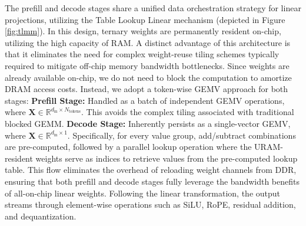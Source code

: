 \documentclass[9pt,sigconf]{acmart}
\begin{document}


The prefill and decode stages share a unified data orchestration strategy for linear projections, utilizing the Table Lookup Linear mechanism (depicted in Figure \ref{fig:tlmm}). In this design, ternary weights are permanently resident on-chip, utilizing the high capacity of RAM. A distinct advantage of this architecture is that it eliminates the need for complex weight-reuse tiling schemes typically required to mitigate off-chip memory bandwidth bottlenecks. Since weights are already available on-chip, we do not need to block the computation to amortize DRAM access costs. Instead, we adopt a token-wise GEMV approach for both stages:
\textbf{Prefill Stage:} Handled as a batch of independent GEMV operations, where $\mathbf{X} \in \mathbb{R}^{d_{\text{in}} \times N_{\text{tokens}}}$. This avoids the complex tiling associated with traditional blocked GEMM.
\textbf{Decode Stage:} Inherently persists as a single-vector GEMV, where $\mathbf{X} \in \mathbb{R}^{d_{\text{in}} \times 1}$.
Specifically, for every value group, add/subtract combinations are pre-computed, followed by a parallel lookup operation where the URAM-resident weights serve as indices to retrieve values from the pre-computed lookup table. This flow eliminates the overhead of reloading weight channels from DDR, ensuring that both prefill and decode stages fully leverage the bandwidth benefits of all-on-chip linear weights. Following the linear transformation, the output streams through element-wise operations such as SiLU, RoPE, residual addition, and dequantization.
\end{document}
